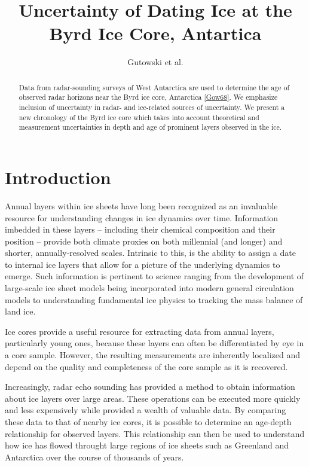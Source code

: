 \documentclass[draft,jgrga]{agutex}
\begin{document}
\title{Uncertainty of Dating Ice at the Byrd Ice Core, Antartica}
\author{Gutowski et al.}

\begin{abstract}
Data from radar-sounding surveys of West Antarctica are used to
determine the age of observed radar horizons near the Byrd ice core,
Antarctica \ref{Gow68}. We emphasize inclusion of uncertainty in
radar- and ice-related sources of uncertainty. We present a new
chronology of the Byrd ice core which takes into account theoretical
and measurement uncertainties in depth and age of prominent layers
observed in the ice.
\end{abstract}

\section{Introduction}


Annual layers within ice sheets have long been recognized as an
invaluable resource for understanding changes in ice dynamics over
time. Information imbedded in these layers -- including their chemical
composition and their position -- provide both climate proxies on both
millennial (and longer) and shorter, annually-resolved
scales. Intrinsic to this, is the ability to assign a date to internal
ice layers that allow for a picture of the underlying dynamics to
emerge. Such information is pertinent to science ranging from the 
development of
large-scale ice sheet models being incorporated into modern general
circulation models to understanding fundamental ice physics to
tracking the mass balance of land ice.

Ice cores provide a useful resource for extracting data from annual
layers, particularly young ones, because these layers can often be
differentiated by eye in a core sample. However, the resulting
measurements are inherently localized and depend on the quality and
completeness of the core sample as it is recovered. 

Increasingly, radar echo sounding has provided a method to obtain 
information about ice layers over large areas. These operations can 
be executed more
quickly and less expensively while provided a wealth of valuable
data. By comparing these data to that of nearby ice cores, it is
possible to determine an age-depth relationship for observed
layers. This relationship can then be used to understand how ice has
flowed throught large regions of ice sheets such as Greenland and
Antarctica over the course of thousands of years.
\end{document}
